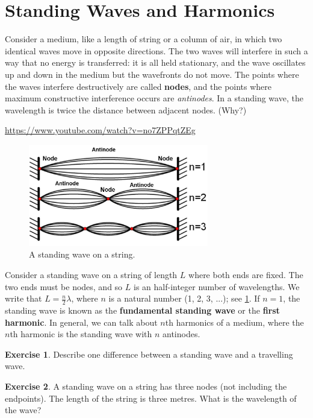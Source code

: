 \documentclass[a4paper]{amsbook}
\newcommand{\goandwatch}[1]{
\begin{center}
\begin{tcolorbox}[width=0.8\textwidth,colback={SkyBlue!20},title={\textbf{Go and watch...}},colbacktitle=MidnightBlue,coltitle=White]
  \textcolor{MidnightBlue}{\url{#1}}
\end{tcolorbox}
\end{center}}
\theoremstyle{definition}
\newtheorem{exercise}{Exercise}
\numberwithin{exercise}{chapter}
\numberwithin{exercise}{chapter}
\begin{document}
\section{Standing Waves and Harmonics}
Consider a medium, like a length of string or a column of air, in which two identical waves move in opposite directions. The two
waves will interfere in such a way that no energy is transferred: it is all held stationary, and the wave oscillates up and down
in the medium but the wavefronts do not move. The points where the waves interfere destructively are called \textbf{nodes}, and
the points where maximum constructive interference occurs are \textit{antinodes}. In a standing wave, the wavelength is twice
the distance between adjacent nodes. (Why?)

\goandwatch{https://www.youtube.com/watch?v=no7ZPPqtZEg}

\begin{figure}
  \centering
  \includegraphics[width=0.7\textwidth]{standingwave}
  \caption{A standing wave on a string.}\label{fig:standingwave}
\end{figure}

Consider a standing wave on a string of length $ L $ where both ends are fixed. The two ends must be nodes, and so $ L $ is an half-integer
number of wavelengths. We write that $ L = \frac{n}{2} \lambda $, where $ n $ is a natural number (1, 2, 3, ...); see \cref{fig:standingwave}.
If $ n = 1 $, the standing wave is known as the \textbf{fundamental standing wave} or the \textbf{first harmonic}. In general, we can
talk about $ n$th harmonics of a medium, where the $ n$th harmonic is the standing wave with $ n $ antinodes.

\begin{exercise}
  Describe one difference between a standing wave and a travelling wave.
\end{exercise}

\begin{exercise}
  A standing wave on a string has three nodes (not including the endpoints). The length of the string is three metres. What
  is the wavelength of the wave?
\end{exercise}
\end{document}
